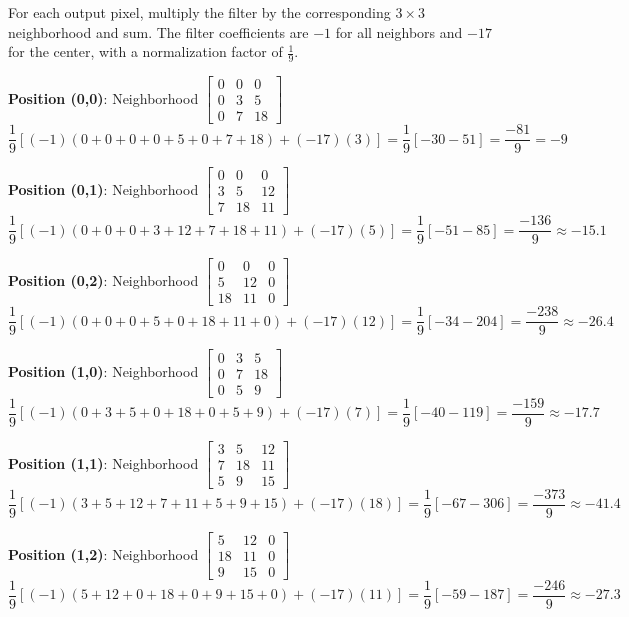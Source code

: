 \documentclass[12pt]{article}
\begin{document}
\begin{stepbox}

For each output pixel, multiply the filter by the corresponding $3 \times 3$ neighborhood and sum. The filter coefficients are $-1$ for all neighbors and $-17$ for the center, with a normalization factor of $\frac{1}{9}$.

\vspace{0.2cm}
\textbf{Position (0,0)}: Neighborhood $\begin{bmatrix} 0 & 0 & 0 \\ 0 & 3 & 5 \\ 0 & 7 & 18 \end{bmatrix}$
\[
\frac{1}{9}[(-1)(0+0+0+0+5+0+7+18) + (-17)(3)] = \frac{1}{9}[-30-51] = \frac{-81}{9} = -9
\]

\textbf{Position (0,1)}: Neighborhood $\begin{bmatrix} 0 & 0 & 0 \\ 3 & 5 & 12 \\ 7 & 18 & 11 \end{bmatrix}$
\[
\frac{1}{9}[(-1)(0+0+0+3+12+7+18+11) + (-17)(5)] = \frac{1}{9}[-51-85] = \frac{-136}{9} \approx -15.1
\]

\textbf{Position (0,2)}: Neighborhood $\begin{bmatrix} 0 & 0 & 0 \\ 5 & 12 & 0 \\ 18 & 11 & 0 \end{bmatrix}$
\[
\frac{1}{9}[(-1)(0+0+0+5+0+18+11+0) + (-17)(12)] = \frac{1}{9}[-34-204] = \frac{-238}{9} \approx -26.4
\]

\end{stepbox}

\begin{stepbox}

\textbf{Position (1,0)}: Neighborhood $\begin{bmatrix} 0 & 3 & 5 \\ 0 & 7 & 18 \\ 0 & 5 & 9 \end{bmatrix}$
\[
\frac{1}{9}[(-1)(0+3+5+0+18+0+5+9) + (-17)(7)] = \frac{1}{9}[-40-119] = \frac{-159}{9} \approx -17.7
\]

\textbf{Position (1,1)}: Neighborhood $\begin{bmatrix} 3 & 5 & 12 \\ 7 & 18 & 11 \\ 5 & 9 & 15 \end{bmatrix}$
\[
\frac{1}{9}[(-1)(3+5+12+7+11+5+9+15) + (-17)(18)] = \frac{1}{9}[-67-306] = \frac{-373}{9} \approx -41.4
\]

\textbf{Position (1,2)}: Neighborhood $\begin{bmatrix} 5 & 12 & 0 \\ 18 & 11 & 0 \\ 9 & 15 & 0 \end{bmatrix}$
\[
\frac{1}{9}[(-1)(5+12+0+18+0+9+15+0) + (-17)(11)] = \frac{1}{9}[-59-187] = \frac{-246}{9} \approx -27.3
\]

\end{stepbox}
\end{document}
